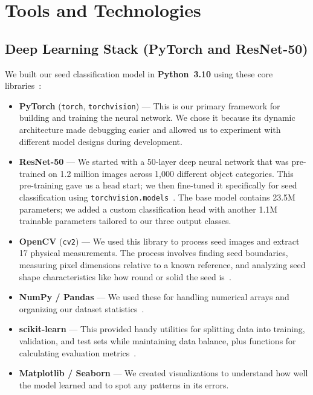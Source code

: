\section{Tools and Technologies}

\subsection{Deep Learning Stack (PyTorch and ResNet-50)}

We built our seed classification model in \textbf{Python~3.10} using these
core libraries~\cite{pytorch2019}:

\begin{itemize}
  \item \textbf{PyTorch} (\texttt{torch}, \texttt{torchvision}) — This is our
        primary framework for building and training the neural network. We chose
        it because its dynamic architecture made debugging easier and allowed us
        to experiment with different model designs during development.

  \item \textbf{ResNet-50} — We started with a 50-layer deep neural network
        that was pre-trained on 1.2 million images across 1{,}000 different
        object categories. This pre-training gave us a head start; we then
        fine-tuned it specifically for seed classification using
        \texttt{torchvision.models}~\cite{he2016deep}. The base model contains
        23.5M parameters; we added a custom classification head with another
        1.1M trainable parameters tailored to our three output classes.

  \item \textbf{OpenCV} (\texttt{cv2}) — We used this library to process seed
        images and extract 17 physical measurements. The process involves
        finding seed boundaries, measuring pixel dimensions relative to a known
        reference, and analyzing seed shape characteristics like how round or
        solid the seed is~\cite{opencv2015}.

  \item \textbf{NumPy / Pandas} — We used these for handling numerical arrays
        and organizing our dataset statistics~\cite{harris2020numpy}.

  \item \textbf{scikit-learn} — This provided handy utilities for splitting
        data into training, validation, and test sets while maintaining data
        balance, plus functions for calculating evaluation metrics~\cite{pedregosa2011sklearn}.

  \item \textbf{Matplotlib / Seaborn} — We created visualizations to understand
        how well the model learned and to spot any patterns in its errors.
\end{itemize}

